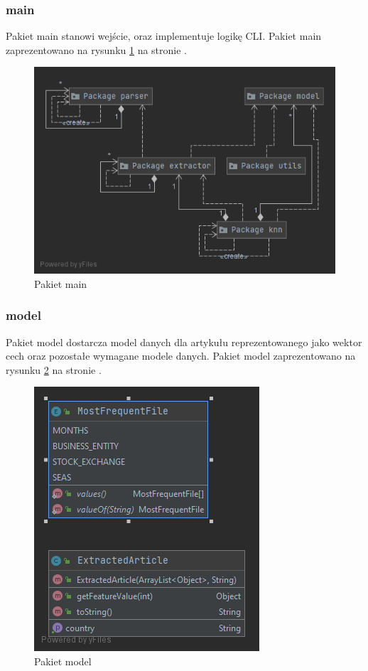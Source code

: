 \documentclass{classrep}
\begin{document}
\subsubsection{main}
Pakiet main stanowi wejście, oraz implementuje logikę CLI. Pakiet main zaprezentowano na rysunku \ref{main} na stronie \pageref{main}.

\begin{figure}
\label{main}
\includegraphics[scale=0.5]{Package main}
\caption{Pakiet main}
\end{figure}


\subsubsection{model}
Pakiet model dostarcza model danych dla artykułu reprezentowanego jako wektor cech oraz pozostałe wymagane modele danych. Pakiet model zaprezentowano na rysunku \ref{mdl} na stronie \pageref{mdl}.

\begin{figure}
\label{mdl}
\includegraphics[scale=0.5]{Package model}
\caption{Pakiet model}
\end{figure}
\end{document}
